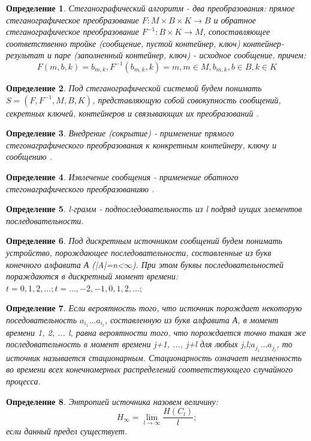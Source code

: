 ﻿\documentclass[a4paper,12pt]{article}
\theoremstyle{plain}
\newtheorem{definition}{Определение}[section]
\begin{document}
\begin{definition}\label{algoritm}
	Стеганографический алгоритм - два преобразования: прямое стеганографическое преобразование $F:M \times B \times K \to B$ и обратное стеганографическое преобразование $F^{-1}:B \times K \to M$, сопоставляющее соответственно тройке (сообщение, пустой контейнер, ключ) контейнер-результат и паре (заполненный контейнер, ключ) - исходное сообщение, \cite{agranovskiy}причем:
	\begin{equation}\label{algoritm equation}
		F(m, b, k) = b_{m,k}, F^{-1}(b_{m,k}, k) = m, m \in M, b_{m,k}, b \in B, k \in K
	\end{equation}
\end{definition}

\begin{definition}\label{stenography system}
	Под стеганографической системой будем понимать $S=(F, F^{-1}, M, B, K)$, представляющую собой совокупность сообщений, секретных ключей, контейнеров и связывающих их преобразований \cite{agranovskiy}.
\end{definition}

\begin{definition}\label{input}
	Внедрение (сокрытие) - применение прямого стегонаграфического преобразования к конкретным контейнеру, ключу и сообщению \cite{agranovskiy}.
\end{definition}

\begin{definition}\label{inside}
	Извлечение сообщения - применение обатного стегонаграфического преобразованияю \cite{agranovskiy}.
\end{definition}

\begin{definition}\label{l-gramm}
	l-грамм - подпоследовательность из l подряд иущих элементов последовательности.
\end{definition}

\begin{definition}
	Под дискретным источником сообщений будем понимать устройство, порождающее последовательности, составленные из букв конечного алфавита А (|A|=n<$\infty$). При этом буквы последовательностей пораждаются в дискретный момент времени:$ t = 0, 1, 2, ...; t = ...,-2, -1, 0, 1, 2, ...;$ \cite{duhin}
\end{definition}
\begin{definition}
	Если вероятность того, что источник порождает некоторую поседовательность $a_{i_1}...a_{i_l}$, составленную из букв алфавита А, в момент времени 1, 2, ... l, равна вероятности того, что порождается точно такая же последовательность в момент времени j+1, ..., j+l для любых j,l;$a_{j_1}...a_{j_l}$, то источник называется стационарным.\cite{duhin}
	Стационарность означает неизменность во времени всех конечномерных распределений соответствующего случайного процесса.
\end{definition}
\begin{definition}
	Энтропией источника назовем величину: 
	\begin{equation}
	H_\infty = \lim_{l \to \infty} \frac{H(C_l)}{l};
	 \end{equation}
	 если данный предел существует\cite{duhin}.
\end{definition}
 \clearpage
\end{document}
